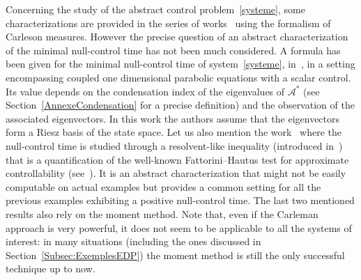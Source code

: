 \documentclass[11pt]{article}
\theoremstyle{definition}
\numberwithin{equation}{section}
\numberwithin{figure}{section}
\numberwithin{table}{section}
\newcommand\As{\mathcal{A}^*}
\begin{document}
Concerning the study of the abstract control problem~\eqref{systeme}, some characterizations are provided in the series of works~\cite{TheseGaunard,JacobPartingtonPott2007,JacobPartingtonPott2010, JacobPartingtonPott2013,JacobPartingtonPott2014} using the formalism of Carleson measures. However the precise question of an abstract characterization of the minimal null-control time has not been much considered. A formula has been given for the minimal null-control time of system~\eqref{systeme}, in~\cite{AmmarKhodjaBenabdallahGonzalez-BurgosdeTeresa:2014}, in a setting encompassing coupled one dimensional parabolic equations with a scalar control. Its value depends on the condensation index of the eigenvalues of $\As$ (see Section~\ref{AnnexeCondensation} for a precise definition) and the observation of the associated eigenvectors. In this work the authors assume that the eigenvectors form a Riesz basis of the state space. Let us also mention the work~\cite{AKBGBM_2018} where the null-control time is studied through a resolvent-like inequality (introduced in~\cite{DuyckaertsMiller12}) that is a quantification of the well-known Fattorini--Hautus test for approximate controllability (see~\cite{Fattorini66, Olive13}). It is an abstract characterization that might not be easily computable on actual examples but provides a common setting for all the previous examples exhibiting a positive null-control time. The last two mentioned results also rely on the moment method. Note that, even if the Carleman approach is very powerful, it does not seem to be applicable to all the systems of interest: in many situations (including the ones discussed in Section~\ref{Subsec:ExemplesEDP}) the moment method is still the only successful technique up to now.
\end{document}
